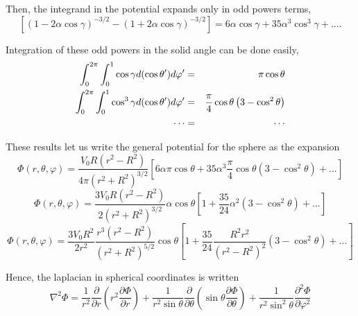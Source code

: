 Then, the integrand in the potential expands only in odd powers terms,
\begin{equation}
\left[ \left( 1- 2 \alpha \cos \gamma \right)^{-3/2} -  \left(1+ 2 \alpha \cos \gamma \right)^{-3/2}  \right] =  6 \alpha \cos \gamma  + 35  \alpha ^3 \cos ^3 \gamma + ... . 
\end{equation}

Integration of these odd powers in the solid angle can be done easily,
\begin{eqnarray}
\int_0^{2\pi} \int_0^1 \cos \gamma d(\cos \theta ') d\varphi ' &=& \pi \cos \theta \\
\int_0^{2\pi} \int_0^1 \cos ^3 \gamma d(\cos \theta ') d\varphi ' &=& \frac{\pi}{4} \cos \theta \left( 3 - \cos ^2 \theta \right)\\
\cdots &=& \cdots \notag
\end{eqnarray}

These results let us write the general potential for the sphere as the expansion
\begin{equation}
\Phi (r, \theta, \varphi ) = \frac{V_0 R \left(  r^2- R^2 \right)}{4 \pi (r^2 + R^2)^{3/2}} \left[ 6 \alpha  \pi \cos \theta + 35  \alpha ^3 \frac{\pi}{4} \cos \theta \left( 3 - \cos ^2 \theta \right) + ... \right]
\end{equation}
\begin{equation}
\Phi (r, \theta, \varphi ) = \frac{3V_0 R \left(  r^2- R^2 \right)}{2 (r^2 + R^2)^{3/2}}  \alpha \cos \theta \left[  1 +  \frac{35}{24}  \alpha ^2 \left( 3 - \cos ^2 \theta \right) + ... \right]
\end{equation}
\begin{equation}
\Phi (r, \theta, \varphi ) = \frac{3V_0 R^2}{2 r^2}  \frac{r^3  \left(  r^2- R^2 \right)}{(r^2 + R^2)^{5/2}} \cos \theta \left[  1 +  \frac{35}{24}  \frac{R^2 r^2}{(r^2 - R^2)^2} \left( 3 - \cos ^2 \theta \right) + ... \right]
\end{equation}

Hence, the laplacian in spherical coordinates is written
\begin{equation}
\nabla^2 \Phi = \frac{1}{r^2}\frac{\partial}{\partial r} \left( r^2 \frac{\partial \Phi}{\partial r} \right) + \frac{1}{r^2 \sin \theta} \frac{\partial}{\partial \theta} \left( \sin \theta \frac{\partial \Phi}{\partial \theta} \right)+ \frac{1}{r^2 \sin^2 \theta} \frac{\partial ^2 \Phi}{\partial \varphi ^2} 
\end{equation}